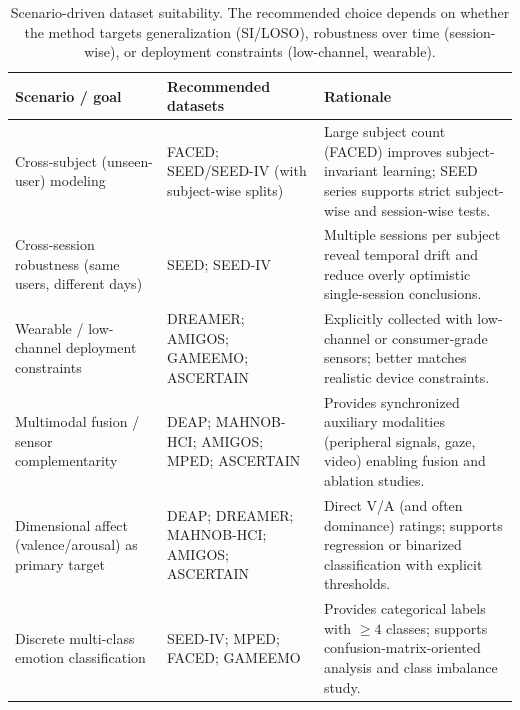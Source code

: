 \documentclass{WileyMSP-template}
\begin{document}
\begin{table}[t]
\centering
\footnotesize
\setlength{\tabcolsep}{4pt}
\renewcommand{\arraystretch}{1.25}
\begin{tabular}{|p{3.3cm}|p{4.6cm}|p{5.0cm}|}
\hline
\textbf{Scenario / goal} & \textbf{Recommended datasets} & \textbf{Rationale} \\
\hline
Cross-subject (unseen-user) modeling & FACED; SEED/SEED-IV (with subject-wise splits) & Large subject count (FACED) improves subject-invariant learning; SEED series supports strict subject-wise and session-wise tests. \\
\hline
Cross-session robustness (same users, different days) & SEED; SEED-IV & Multiple sessions per subject reveal temporal drift and reduce overly optimistic single-session conclusions. \\
\hline
Wearable / low-channel deployment constraints & DREAMER; AMIGOS; GAMEEMO; ASCERTAIN & Explicitly collected with low-channel or consumer-grade sensors; better matches realistic device constraints. \\
\hline
Multimodal fusion / sensor complementarity & DEAP; MAHNOB-HCI; AMIGOS; MPED; ASCERTAIN & Provides synchronized auxiliary modalities (peripheral signals, gaze, video) enabling fusion and ablation studies. \\
\hline
Dimensional affect (valence/arousal) as primary target & DEAP; DREAMER; MAHNOB-HCI; AMIGOS; ASCERTAIN & Direct V/A (and often dominance) ratings; supports regression or binarized classification with explicit thresholds. \\
\hline
Discrete multi-class emotion classification & SEED-IV; MPED; FACED; GAMEEMO & Provides categorical labels with $\ge 4$ classes; supports confusion-matrix-oriented analysis and class imbalance study. \\
\hline
\end{tabular}
\caption{Scenario-driven dataset suitability. The recommended choice depends on whether the method targets generalization (SI/LOSO), robustness over time (session-wise), or deployment constraints (low-channel, wearable).}
\label{tab:scenario_map}
\end{table}
\end{document}
